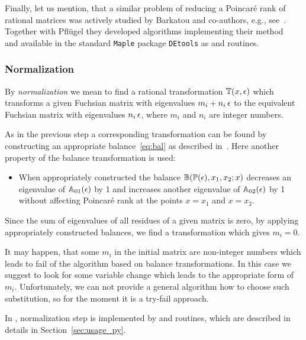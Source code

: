 \documentclass[12pt,a4paper]{article}
\def\M#1{\mathbb{#1}} %
\begin{document}
Finally, let us mention, that a similar problem of reducing a Poincar\'e rank of rational matrices was actively studied by Barkatou and co-authors, e.g., see~\cite{BP99}.
Together with Pfl\"ugel they developed algorithms implementing their method~\cite{BP99} and available in the standard \texttt{Maple} package \texttt{DEtools} as  and  routines.


\subsubsection{Normalization}
\label{sec:norm}

By {\em normalization} we mean to find a rational transformation $\M T(x,\eps)$ which transforms a given Fuchsian matrix with eigenvalues $m_i + n_i \, \epsilon$ to the equivalent Fuchsian matrix with eigenvalues $n_i \, \epsilon$, where $m_i$ and $n_i$ are integer numbers.

As in the previous step a corresponding transformation can be found by constructing an appropriate balance~\eqref{eq:bal} as described in~\cite[p.~11]{Lee15}.
Here another property of the balance transformation is used:
\begin{itemize}
  \item When appropriately constructed the balance $\M B(\M P(\eps), x_1, x_2; x)$ decreases an eigenvalue of $\M A_{01}(\eps)$ by 1 and increases another eigenvalue of $\M A_{02}(\eps)$ by 1 without affecting Poincar\'e rank at the points $x=x_1$ and $x=x_2$.
\end{itemize}
Since the sum of eigenvalues of all residues of a given matrix is zero, by applying appropriately constructed balances, we find a transformation which gives $m_i = 0$.

It may happen, that some $m_i$ in the initial matrix are non-integer numbers which leads to fail of the algorithm based on balance transformations.
In this case we suggest to look for some variable change which leads to the appropriate form of $m_i$.
Unfortunately, we can not provide a general algorithm how to choose such substitution, so for the moment it is a try-fail approach.

In \fuchsia, normalization step is implemented by  and  routines, which are described in details in Section~\ref{sec:usage_py}.
\end{document}
